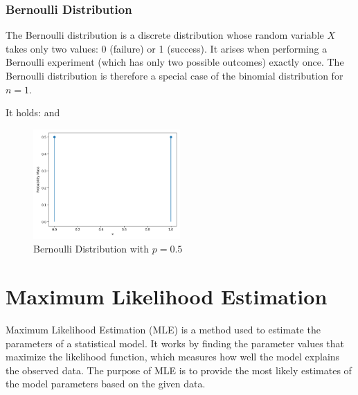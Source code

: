 \subsubsection{Bernoulli Distribution}\label{Bernoulli}
The Bernoulli distribution is a discrete distribution whose random variable $X$ takes only two values: 0 (failure) or 1 (success). It arises when performing a Bernoulli experiment (which has only two possible outcomes) exactly once. The Bernoulli distribution is therefore a special case of the binomial distribution for $n = 1$.

It holds:
and

\begin{figure}[h]
    \centering
    \includegraphics[width=0.5\textwidth]{../images/plot_bernoulli_distribution.png}
    \caption{Bernoulli Distribution with $p=0.5$}
    \label{fig:bernoulli_distribution}
\end{figure}



\section{Maximum Likelihood Estimation}\label{Maximum Likelihood Estimation}
Maximum Likelihood Estimation (MLE) is a method used to estimate the parameters of a statistical model. It works by finding the parameter values that maximize the likelihood function, which measures how well the model explains the observed data. The purpose of MLE is to provide the most likely estimates of the model parameters based on the given data.

